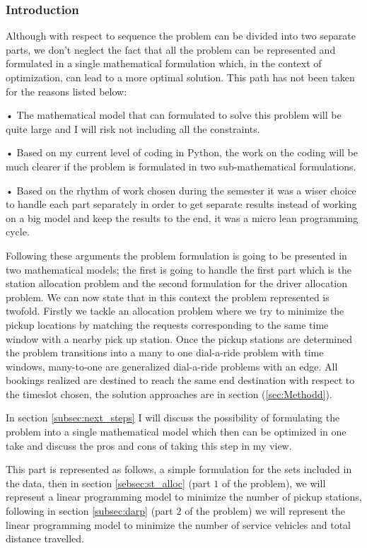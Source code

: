 \documentclass{article}
\begin{document}
\subsubsection{Introduction}
Although with respect to sequence the problem can be divided into two separate parts, we don't neglect the fact that all the problem can be represented and formulated in a single mathematical formulation which, in the context of optimization, can lead to a more optimal solution. This path has not been taken for the reasons listed below:
\begin{list}{}{}
\item • The mathematical model that can formulated to solve this problem will be quite large and I will risk not including all the constraints.
\item • Based on my current level of coding in Python, the work on the coding will be much clearer if the problem is formulated in two sub-mathematical formulations.
\item • Based on the rhythm of work chosen during the semester it was a wiser choice to handle each part separately in order to get separate results instead of working on a big model and keep the results to the end, it was a micro lean programming cycle. %
\end{list}

Following these arguments the problem formulation is going to be presented in two mathematical models; the first is going to handle the first part which is the station allocation problem and the second formulation for the driver allocation problem. We can now state that in this context the problem represented is twofold.
Firstly we tackle an allocation problem where we try to minimize the pickup locations by matching the requests corresponding to the same time window with a nearby pick up station. Once the pickup stations are determined the problem transitions into a many to one dial-a-ride problem with time windows, many-to-one are generalized dial-a-ride problems with an edge. All bookings realized are destined to reach the same end destination with respect to the timeslot chosen, the solution approaches are in section (\ref{sec:Methodd}).


In section \ref{subsec:next_steps} I will discuss the possibility of formulating the problem into a single mathematical model which then can be optimized in one take and discuss the pros and cons of taking this step in my view.

This part is represented as follows, a simple formulation for the sets included in the data, then in section \ref{sebsec:st_alloc} (part $1$ of the problem), we will represent a linear programming model to minimize the number of pickup stations, following in section \ref{subsec:darp} (part $2$ of the problem) we will represent the linear programming model to minimize the number of service vehicles and total distance travelled.
\end{document}
